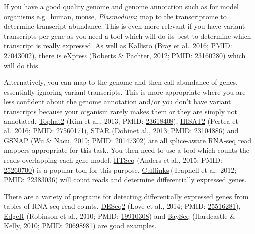 \documentclass[11pt]{article}
\begin{document}
If you have a good quality genome and genome annotation such as for
model organisms e.g.~human, mouse, \textit{Plasmodium}; map to the
transcriptome to determine transcript abundance. This is even more
relevant if you have variant transcripts per gene as you need a tool
which will do its best to determine which transcript is really
expressed. As well as
\href{https://pachterlab.github.io/kallisto/}{Kallisto} (Bray et
al.~2016; PMID:
\href{https://www.ncbi.nlm.nih.gov/pubmed/27043002}{27043002}), there is
\href{https://pachterlab.github.io/eXpress/overview.html}{eXpress}
(Roberts \& Pachter, 2012; PMID:
\href{https://www.ncbi.nlm.nih.gov/pubmed/23160280}{23160280}) which
will do this.

Alternatively, you can map to the genome and then call abundance of
genes, essentially ignoring variant transcripts. This is more
appropriate where you are less confident about the genome annotation
and/or you don't have variant transcripts because your organism rarely
makes them or they are simply not annotated.
\href{https://ccb.jhu.edu/software/tophat/index.shtml}{Tophat2} (Kim et
al., 2013; PMID:
\href{https://www.ncbi.nlm.nih.gov/pubmed/23618408}{23618408}),
\href{https://ccb.jhu.edu/software/hisat2/index.shtml}{HISAT2} (Pertea
et al.~2016; PMID:
\href{https://www.ncbi.nlm.nih.gov/pubmed/27560171}{27560171}),
\href{https://github.com/alexdobin/STAR}{STAR} (Dobinet al., 2013; PMID:
\href{https://www.ncbi.nlm.nih.gov/pubmed/23104886}{23104886}) and
\href{http://research-pub.gene.com/gmap/}{GSNAP} (Wu \& Nacu, 2010;
PMID: \href{https://www.ncbi.nlm.nih.gov/pubmed/20147302}{20147302}) are
all splice-aware RNA-seq read mappers appropriate for this task. You
then need to use a tool which counts the reads overlapping each gene
model. \href{https://htseq.readthedocs.io/en/release_0.10.0/}{HTSeq}
(Anders et al., 2015; PMID:
\href{https://www.ncbi.nlm.nih.gov/pubmed/25260700}{25260700}) is a
popular tool for this purpose.
\href{https://github.com/cole-trapnell-lab/cufflinks}{Cufflinks}
(Trapnell et al.~2012; PMID:
\href{https://www.ncbi.nlm.nih.gov/pubmed/22383036}{22383036}) will
count reads and determine differentially expressed genes.

There are a variety of programs for detecting differentially expressed
genes from tables of RNA-seq read counts.
\href{https://bioconductor.org/packages/release/bioc/html/DESeq2.html}{DESeq2}
(Love et al., 2014; PMID:
\href{https://www.ncbi.nlm.nih.gov/pubmed/25516281}{25516281}),
\href{https://bioconductor.org/packages/release/bioc/html/edgeR.html}{EdgeR}
(Robinson et al., 2010; PMID:
\href{https://www.ncbi.nlm.nih.gov/pubmed/19910308}{19910308}) and
\href{http://bioconductor.org/packages/release/bioc/html/baySeq.html}{BaySeq}
(Hardcastle \& Kelly, 2010; PMID:
\href{https://www.ncbi.nlm.nih.gov/pubmed/20698981}{20698981}) are good
examples.
\end{document}
